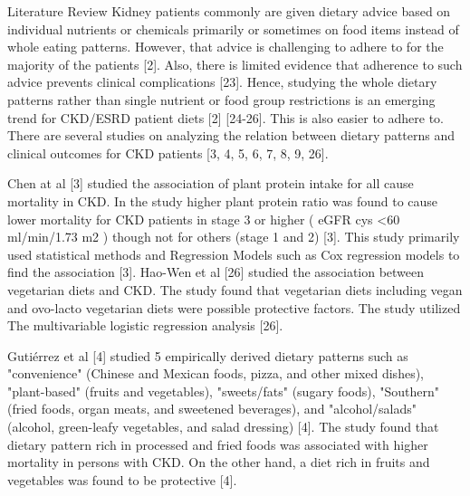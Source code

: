 Literature Review Kidney patients commonly are given dietary advice based on individual nutrients or chemicals primarily or sometimes on food items instead of whole eating patterns. However, that advice is challenging to adhere to for the majority of the patients [2].
Also, there is limited evidence that adherence to such advice prevents clinical complications [23]. Hence, studying the whole dietary patterns rather than single nutrient or food group restrictions is an emerging trend for CKD/ESRD patient diets [2] [24-26]. This is also easier to adhere to. There are several studies on analyzing the relation between dietary patterns and clinical outcomes for CKD patients [3, 4, 5, 6, 7, 8, 9, 26].

Chen at al [3] studied the association of plant protein intake for all cause mortality in CKD. In the study higher plant protein ratio was found to cause lower mortality for CKD patients in stage 3 or higher ( eGFR cys \textless   60 ml/min/1.73 m2 ) though not for others (stage 1
and 2) [3]. This study primarily used statistical methods and Regression Models such as Cox regression models to find the association [3]. Hao-Wen et al [26] studied the association between vegetarian diets and CKD. The study found that vegetarian diets including vegan and
ovo-lacto vegetarian diets were possible protective factors. The study utilized The multivariable logistic regression analysis [26].

Gutiérrez et al [4] studied 5 empirically derived dietary patterns such as "convenience" (Chinese and Mexican foods, pizza, and other mixed dishes), "plant-based" (fruits and vegetables), "sweets/fats" (sugary foods), "Southern" (fried foods, organ meats, and sweetened
beverages), and "alcohol/salads" (alcohol, green-leafy vegetables, and salad dressing) [4]. The study found that dietary pattern rich in processed and fried foods was associated with higher mortality in persons with CKD. On the other hand, a diet rich in fruits and
vegetables was found to be protective [4].

